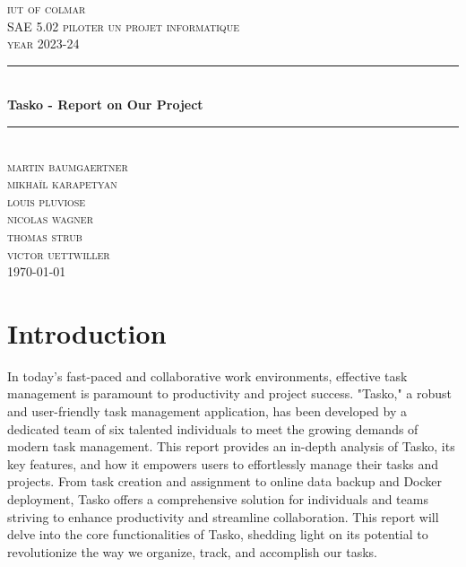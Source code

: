 \documentclass[12pt, a4paper]{article}
\begin{document}
\begin{titlepage}
	\newcommand{\HRule}{\rule{\linewidth}{0.5mm}} 
	\center 
	\textsc{\LARGE iut of colmar}\\[6.5cm] 
	\textsc{\Large SAE 5.02 piloter un projet informatique}\\[0.5cm] 
	\textsc{\large year 2023-24}\\[0.5cm]
	\HRule\\[0.75cm]
	{\Large\bfseries Tasko - Report on Our Project}\\[0.4cm]
	\HRule\\[0.5cm]
	\textsc{\large martin baumgaertner\\mikhaïl karapetyan\\louis pluviose\\nicolas wagner\\thomas strub\\victor uettwiller}\\[6cm] 

	\vfill\vfill\vfill
	{\large\today} 
	\vfill
\end{titlepage}
\newpage
\tableofcontents
\listoffigures
\newpage
\section{Introduction}
In today's fast-paced and collaborative work 
environments, effective task management is paramount 
to productivity and project success. "Tasko," a 
robust and user-friendly task management application, 
has been developed by a dedicated team of six talented 
individuals to meet the growing demands of modern task 
management. This report provides an in-depth analysis 
of Tasko, its key features, and how it empowers users 
to effortlessly manage their tasks and projects. From 
task creation and assignment to online data backup and 
Docker deployment, Tasko offers a comprehensive 
solution for individuals and teams striving to enhance 
productivity and streamline collaboration. This 
report will delve into the core functionalities of 
Tasko, shedding light on its potential to revolutionize 
the way we organize, track, and accomplish our tasks.
\end{document}
